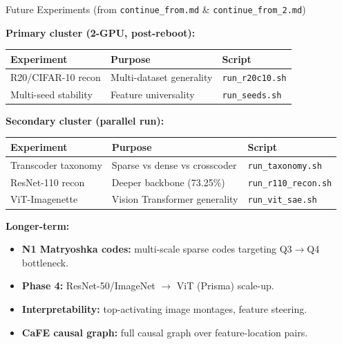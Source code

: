 \documentclass[final]{beamer}
\newlength{\colwidth}
\begin{document}
\begin{frame}[t]
\begin{columns}[t]
\begin{column}{\colwidth}
\vspace{0.5em}

\begin{block}{Future Experiments (from \texttt{continue\_from.md} \& \texttt{continue\_from\_2.md})}
\small

\textbf{Primary cluster (2-GPU, post-reboot):}
\begin{center}
\begin{tabular}{@{}lll@{}}
\toprule
\textbf{Experiment} & \textbf{Purpose} & \textbf{Script} \\
\midrule
R20/CIFAR-10 recon & Multi-dataset generality & \texttt{run\_r20c10.sh} \\
Multi-seed stability & Feature universality & \texttt{run\_seeds.sh} \\
\bottomrule
\end{tabular}
\end{center}

\vspace{0.3em}
\textbf{Secondary cluster (parallel run):}
\begin{center}
\begin{tabular}{@{}lll@{}}
\toprule
\textbf{Experiment} & \textbf{Purpose} & \textbf{Script} \\
\midrule
Transcoder taxonomy & Sparse vs dense vs crosscoder & \texttt{run\_taxonomy.sh} \\
ResNet-110 recon & Deeper backbone (73.25\%) & \texttt{run\_r110\_recon.sh} \\
ViT-Imagenette & Vision Transformer generality & \texttt{run\_vit\_sae.sh} \\
\bottomrule
\end{tabular}
\end{center}

\vspace{0.3em}
\textbf{Longer-term:}
\begin{itemize}[leftmargin=1.5em,itemsep=1pt]
  \item \textbf{N1 Matryoshka codes:} multi-scale sparse codes targeting Q3$\to$Q4 bottleneck.
  \item \textbf{Phase 4:} ResNet-50/ImageNet $\to$ ViT (Prisma) scale-up.
  \item \textbf{Interpretability:} top-activating image montages, feature steering.
  \item \textbf{CaFE causal graph:} full causal graph over feature-location pairs.
\end{itemize}


\end{block}
\end{column}
\end{columns}
\end{frame}
\end{document}
